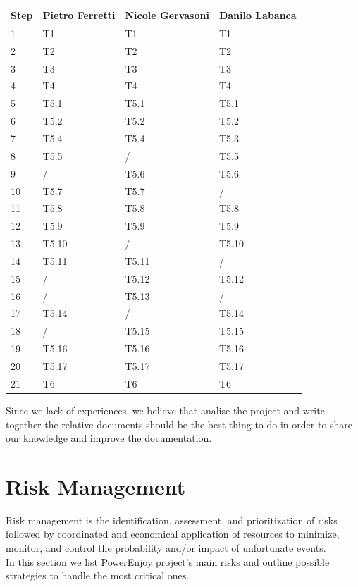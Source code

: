 \documentclass[english]{article}
\begin{document}
\paragraph{}
\begin{center}
	\begin{tabular}{|p{1cm}|p{3cm}|p{3cm}|p{3cm}|}
		\hline
		\multicolumn{1}{|c|}{\textbf{Step}} & \multicolumn{1}{c|}{\textbf{Pietro Ferretti}} & \multicolumn{1}{c|}{\textbf{Nicole Gervasoni}} & \multicolumn{1}{c|}{\textbf{Danilo Labanca}} \\
		\hline
		1 & T1 & T1 & T1\\
		\hline
		2 & T2 & T2 & T2\\
		\hline
		3 & T3 & T3 & T3\\
		\hline
		4 & T4 & T4 & T4\\
		\hline
		5 & T5.1 & T5.1 & T5.1\\
		\hline
		6 & T5.2  & T5.2 & T5.2\\
		\hline
		7 & T5.4 & T5.4 & T5.3\\
		\hline
		8 & T5.5 & / & T5.5\\
		\hline
		9 & / & T5.6 & T5.6\\
		\hline
		10 & T5.7 & T5.7 & /\\
		\hline
		11 & T5.8 & T5.8 & T5.8\\
		\hline
		12 & T5.9 & T5.9 & T5.9\\
		\hline
		13 & T5.10 & / & T5.10\\
		\hline
		14 & T5.11 & T5.11 & /\\
		\hline
		15 & / & T5.12 & T5.12\\
		\hline
		16 & / & T5.13 & /\\
		\hline
		17 & T5.14 & / & T5.14\\
		\hline
		18 & / & T5.15 & T5.15\\
		\hline
		19 & T5.16 & T5.16 & T5.16\\
		\hline
		20 & T5.17 & T5.17 & T5.17\\
		\hline
		21 & T6 & T6 & T6\\
		\hline
	\end{tabular}
\end{center}

Since we lack of experiences, we believe that analise the project and write together the relative documents should be the best thing to do in order to share our knowledge and improve the documentation.

\section{Risk Management}
Risk management is the identification, assessment, and prioritization of risks followed by coordinated and economical application of resources to minimize, monitor, and control the probability and/or impact of unfortunate events.\\
In this section we list PowerEnjoy project's main risks and outline possible strategies to handle the most critical ones.
\end{document}
